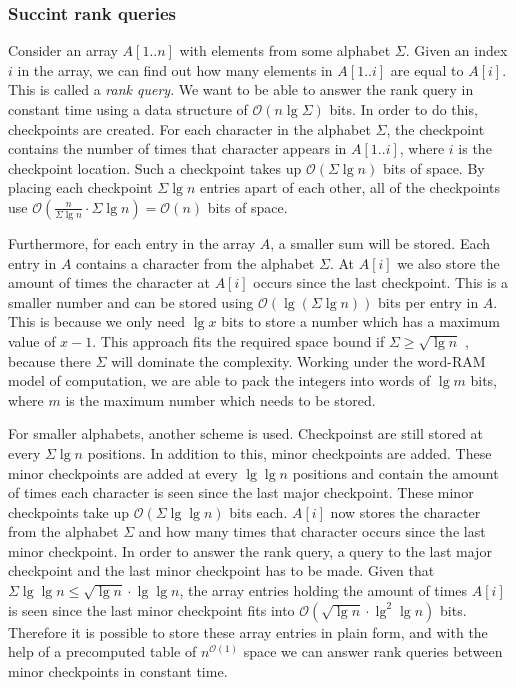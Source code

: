 \subsubsection{Succint rank queries}
\label{sssect:succintrank}
Consider an array $A[1..n]$ with elements from some alphabet $\Sigma$. Given an index $i$ in the array, we can find out how many elements in $A[1..i]$ are equal to $A[i]$. This is called a \emph{rank query}. We want to be able to answer the rank query in constant time using a data structure of $\mathcal{O}(n \lg \Sigma)$ bits. In order to do this, checkpoints are created. For each character in the alphabet $\Sigma$, the checkpoint contains the number of times that character appears in $A[1..i]$, where $i$ is the checkpoint location. Such a checkpoint takes up $\mathcal{O}(\Sigma \lg n)$ bits of space. By placing each checkpoint $\Sigma \lg n$ entries apart of each other, all of the checkpoints use $\mathcal{O}(\frac{n}{\Sigma \lg n} \cdot \Sigma \lg n) = \mathcal{O}(n)$ bits of space.

Furthermore, for each entry in the array $A$, a smaller sum will be stored. Each entry in $A$ contains a character from the alphabet $\Sigma$. At $A[i]$ we also store the amount of times the character at $A[i]$ occurs since the last checkpoint. This is a smaller number and can be stored using $\mathcal{O}(\lg (\Sigma \lg n))$ bits per entry in $A$. This is because we only need $\lg x$ bits to store a number which has a maximum value of $x-1$. This approach fits the required space bound if $\Sigma \geq \sqrt{\lg n}$ , because there $\Sigma$ will dominate the complexity. Working under the word-RAM model of computation, we are able to pack the integers into words of $\lg m$ bits, where $m$ is the maximum number which needs to be stored.

For smaller alphabets, another scheme is used. Checkpoinst are still stored at every $\Sigma \lg n$ positions. In addition to this, minor checkpoints are added. These minor checkpoints are added at every $\lg \lg n$ positions and contain the amount of times each character is seen since the last major checkpoint. These minor checkpoints take up $\mathcal{O}(\Sigma \lg \lg n)$ bits each. $A[i]$ now stores the character from the alphabet $\Sigma$ and how many times that character occurs since the last minor checkpoint. In order to answer the rank query, a query to the last major checkpoint and the last minor checkpoint has to be made. Given that $\Sigma \lg \lg n \leq \sqrt{\lg n} \cdot \lg \lg n$, the array entries holding the amount of times $A[i]$ is seen since the last minor checkpoint fits into $\mathcal{O}(\sqrt{\lg n} \cdot \lg^2 \lg n)$ bits. Therefore it is possible to store these array entries in plain form, and with the help of a precomputed table of $n^{\mathcal{O}(1)}$ space we can answer rank queries between minor checkpoints in constant time.   

